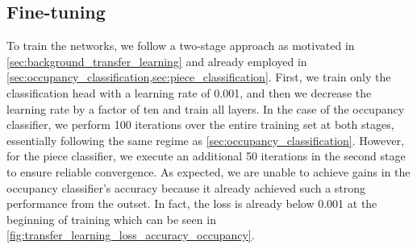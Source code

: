 \documentclass[../main.tex]{subfiles}
\begin{document}
\subsection{Fine-tuning}
\label{sec:transfer_learning_finetuning}
To train the networks, we follow a two-stage approach as motivated in \cref{sec:background_transfer_learning} and already employed in \cref{sec:occupancy_classification,sec:piece_classification}.
First, we train only the classification head with a learning rate of 0.001, and then we decrease the learning rate by a factor of ten and train all layers.
In the case of the occupancy classifier, we perform 100 iterations over the entire training set at both stages, essentially following the same regime as \cref{sec:occupancy_classification}.
However, for the piece classifier, we execute an additional 50 iterations in the second stage to ensure reliable convergence.
As expected, we are unable to achieve gains in the occupancy classifier's accuracy because it already achieved such a strong performance from the outset.
In fact, the loss is already below 0.001 at the beginning of training which can be seen in \cref{fig:transfer_learning_loss_accuracy_occupancy}.
\end{document}
